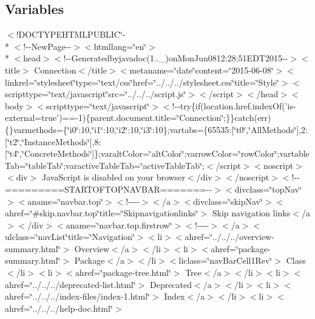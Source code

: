 \subsection*{Variables}
\begin{DoxyCompactItemize}
\item 
$<$!D\-O\-C\-T\-Y\-P\-E\-H\-T\-M\-L\-P\-U\-B\-L\-I\-C\char`\"{}-\/\\*
$<$!-\/-\/New\-Page-\/-\/$>$$<$htmllang=\char`\"{}en\char`\"{}$>$\\*
$<$head$>$$<$!-\/-\/Generatedbyjavadoc(1..\-\_)on\-Mon\-Jun0812\-:28\-:51\-E\-D\-T2015-\/-\/$>$$<$title$>$ Connection$<$/title$>$$<$metaname=\char`\"{}date\char`\"{}content=\char`\"{}2015-\/06-\/08\char`\"{}$>$$<$linkrel=\char`\"{}stylesheet\char`\"{}type=\char`\"{}text/css\char`\"{}href=\char`\"{}../../../stylesheet.\-css\char`\"{}title=\char`\"{}\-Style\char`\"{}$>$$<$scripttype=\char`\"{}text/javascript\char`\"{}src=\char`\"{}../../../script.\-js\char`\"{}$>$$<$/script$>$$<$/head$>$$<$body$>$$<$scripttype=\char`\"{}text/javascript\char`\"{}$>$$<$!-\/-\/try\{if(location.\-href.\-index\-Of('is-\/external=true')==-\/1)\{parent.\-document.\-title=\char`\"{}\-Connection\char`\"{};\}\}catch(err)\{\}varmethods=\{\char`\"{}i0\char`\"{}\-:10,\char`\"{}i1\char`\"{}\-:10,\char`\"{}i2\char`\"{}\-:10,\char`\"{}i3\char`\"{}\-:10\};vartabs=\{65535\-:\mbox{[}\char`\"{}t0\char`\"{},\char`\"{}\-All\-Methods\char`\"{}\mbox{]},2\-:\mbox{[}\char`\"{}t2\char`\"{},\char`\"{}\-Instance\-Methods\char`\"{}\mbox{]},8\-:\mbox{[}\char`\"{}t4\char`\"{},\char`\"{}\-Concrete\-Methods\char`\"{}\mbox{]}\};varalt\-Color=\char`\"{}alt\-Color\char`\"{};varrow\-Color=\char`\"{}row\-Color\char`\"{};vartable\-Tab=\char`\"{}table\-Tab\char`\"{};varactive\-Table\-Tab=\char`\"{}active\-Table\-Tab\char`\"{};$<$/script$>$$<$noscript$>$$<$div$>$ Java\-Script is disabled on your browser$<$/div$>$$<$/noscript$>$$<$!-\/-\/=========\-S\-T\-A\-R\-T\-O\-F\-T\-O\-P\-N\-A\-V\-B\-A\-R=======-\/-\/$>$$<$divclass=\char`\"{}top\-Nav\char`\"{}$>$$<$aname=\char`\"{}navbar.\-top\char`\"{}$>$$<$!-\/-\/-\/-\/$>$$<$/a$>$$<$divclass=\char`\"{}skip\-Nav\char`\"{}$>$$<$ahref=\char`\"{}\#skip.\-navbar.\-top\char`\"{}title=\char`\"{}\-Skipnavigationlinks\char`\"{}$>$ Skip navigation links$<$/a$>$$<$/div$>$$<$aname=\char`\"{}navbar.\-top.\-firstrow\char`\"{}$>$$<$!-\/-\/-\/-\/$>$$<$/a$>$$<$ulclass=\char`\"{}nav\-List\char`\"{}title=\char`\"{}\-Navigation\char`\"{}$>$$<$li$>$$<$ahref=\char`\"{}../../../overview-\/summary.\-html\char`\"{}$>$ Overview$<$/a$>$$<$/li$>$$<$li$>$$<$ahref=\char`\"{}package-\/summary.\-html\char`\"{}$>$ Package$<$/a$>$$<$/li$>$$<$liclass=\char`\"{}nav\-Bar\-Cell1\-Rev\char`\"{}$>$ Class$<$/li$>$$<$li$>$$<$ahref=\char`\"{}package-\/tree.\-html\char`\"{}$>$ Tree$<$/a$>$$<$/li$>$$<$li$>$$<$ahref=\char`\"{}../../../deprecated-\/list.\-html\char`\"{}$>$ Deprecated$<$/a$>$$<$/li$>$$<$li$>$$<$ahref=\char`\"{}../../../index-\/files/index-\/1.\-html\char`\"{}$>$ Index$<$/a$>$$<$/li$>$$<$li$>$$<$ahref=\char`\"{}../../../help-\/doc.\-html\char`\"{}$>$ $$
\end{DoxyCompactItemize}
